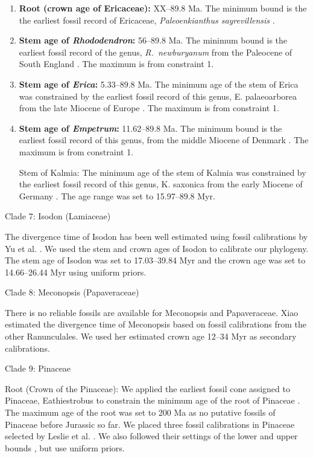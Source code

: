 \documentclass[10pt]{article}
\begin{document}
\begin{enumerate}

\item \textbf{Root (crown age of Ericaceae):} XX--89.8 Ma. The minimum
  bound is the the earliest fossil record of Ericaceae,
  \textit{Paleoenkianthus sayrevillensis} \citep{Nixon1993}.

\item \textbf{Stem age of \textit{Rhododendron}:} 56--89.8 Ma. The
  minimum bound is the earliest fossil record of the genus,
  \textit{R.~newburyanum} from the Paleocene of South England
  \citep{Collinson1978}. The maximum is from constraint 1.

\item \textbf{Stem age of \textit{Erica}:} 5.33--89.8 Ma. The minimum
  age of the stem of Erica was constrained by the earliest fossil
  record of this genus, E. palaeoarborea from the late Miocene of
  Europe \citep{VanderBurgh1987}. The maximum is from constraint 1.

\item \textbf{Stem age of \textit{Empetrum}:} 11.62--89.8 Ma. The
  minimum bound is the earliest fossil record of this genus, from the
  middle Miocene of Denmark \citep{Friis1979}. The maximum is from
  constraint 1.

  Stem of Kalmia: The minimum age of the stem of Kalmia was
  constrained by the earliest fossil record of this genus, K. saxonica
  from the early Miocene of Germany \citep{VanderBurgh1987}. The age
  range was set to 15.97--89.8 Myr.
\end{enumerate}
Clade 7: Isodon (Lamiaceae)

The divergence time of Isodon has been well estimated using fossil
calibrations by Yu et al. \citep{Yu2014}. We used the stem and crown
ages of Isodon to calibrate our phylogeny. The stem age of Isodon was
set to 17.03--39.84 Myr and the crown age was set to 14.66--26.44 Myr
\citep{Yu2014} using uniform priors.

Clade 8: Meconopsis (Papaveraceae)

There is no reliable fossils are available for Meconopsis and
Papaveraceae. Xiao \citep{Xiao2013} estimated the divergence time of
Meconopsis based on fossil calibrations from the other
Ranunculales. We used her estimated crown age 12--34 Myr as secondary
calibrations.

Clade 9: Pinaceae

Root (Crown of the Pinaceae): We applied the earliest fossil cone
assigned to Pinaceae, Eathiestrobus to constrain the minimum age of
the root of Pinaceae \citep{Rothwell2012}. The maximum age of the root
was set to 200 Ma as no putative fossils of Pinaceae before Jurassic
so far. We placed three fossil calibrations in Pinaceae selected by
Leslie et al. \citep{Leslie2012}. We also followed their settings of
the lower and upper bounds \citep{Leslie2012}, but use uniform priors.
\end{document}
